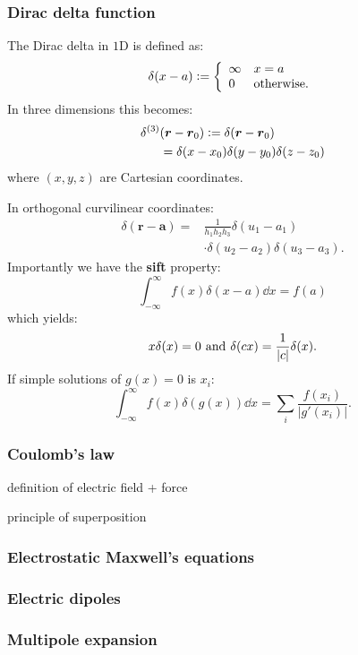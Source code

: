 \documentclass{article}
\newcommand{\deq}{\vcentcolon=}
\newcommand{\vc}[1]{\boldsymbol{#1}}
\begin{document}
\begin{multicols*}{3}
\subsubsection*{Dirac delta function}
The Dirac delta in $1$D is defined as:
$$\delta(x-a)\deq\left\{\begin{array}{ll}
    \infty & x=a \\
    0 & \text{otherwise}.
\end{array}\right.$$
In three dimensions this becomes:
\begin{align*}
    \delta^{(3)}&(\vc{r}-\vc{r}_0)
    \deq\delta(\vc{r}-\vc{r}_0) \\
    &=\delta(x-x_0)\delta(y-y_0)\delta(z-z_0)
\end{align*}
where $(x,y,z)$ are Cartesian coordinates.

In orthogonal curvilinear coordinates:
\begin{align*}
    \delta(\vc{r}-\vc{a})
    =&\frac{1}{h_1 h_2 h_3}\delta(u_1-a_1) \\
    &\cdot\delta(u_2-a_2)\delta(u_3-a_3).
\end{align*}
Importantly we have the \textbf{sift} property:
$$\int_{-\infty}^{\infty}f(x)\delta(x-a)\dd x=f(a)$$
which yields:
$$x\delta(x)=0
\hspace{0.05in}\text{and}\hspace{0.05in}
\delta(cx)=\frac{1}{|c|}\delta(x).$$
If simple solutions of $g(x)=0$ is $x_i$:
$$\int_{-\infty}^{\infty}f(x)\delta(g(x))\dd x
=\sum_i\frac{f(x_i)}{|g'(x_i)|}.$$

\subsubsection*{Coulomb's law}
definition of electric field + force

principle of superposition

\subsubsection*{Electrostatic Maxwell's equations}

\subsubsection*{Electric dipoles}

\subsubsection*{Multipole expansion}


\end{multicols*}
\end{document}

